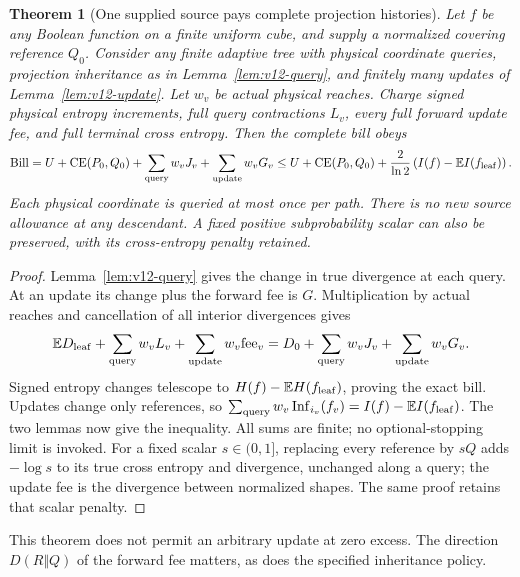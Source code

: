 \documentclass[11pt]{article}
\newtheorem{theorem}[lemma]{Theorem}
\begin{document}
\begin{theorem}[One supplied source pays complete projection histories]\label{thm:v12-bill}
Let $f$ be any Boolean function on a finite uniform cube, and supply a normalized
covering reference $Q_0$. Consider any finite adaptive tree with physical coordinate
queries, projection inheritance as in Lemma~\ref{lem:v12-query}, and finitely many
updates of Lemma~\ref{lem:v12-update}. Let $w_v$ be actual physical reaches.
Charge signed physical entropy increments, full query contractions $L_v$, every full
forward update fee, and full terminal cross entropy. Then the complete bill obeys
\[
 \mathrm{Bill}=U+\operatorname{CE}(P_0,Q_0)
               +\sum_{\rm query}w_vJ_v+\sum_{\rm update}w_vG_v
 \leq U+\operatorname{CE}(P_0,Q_0)
     +\frac2{\ln2}\left(I(f)-\mathbb E I(f_{\rm leaf})\right).
\]
Each physical coordinate is queried at most once per path. There is no new source
allowance at any descendant. A fixed positive subprobability scalar can also be
preserved, with its cross-entropy penalty retained.
\end{theorem}
\begin{proof}
Lemma~\ref{lem:v12-query} gives the change in true divergence at each query.
At an update its change plus the forward fee is $G$.
Multiplication by actual reaches and cancellation of all interior divergences gives
\[
 \mathbb E D_{\rm leaf}+\sum_{\rm query}w_vL_v
   +\sum_{\rm update}w_v\mathrm{fee}_v
 =D_0+\sum_{\rm query}w_vJ_v+\sum_{\rm update}w_vG_v.
\]
Signed entropy changes telescope to $H(f)-\mathbb EH(f_{\rm leaf})$, proving the
exact bill. Updates change only references, so
$\sum_{\rm query}w_v\operatorname{Inf}_{i_v}(f_v)
=I(f)-\mathbb EI(f_{\rm leaf})$.
The two lemmas now give the inequality. All sums are finite; no optional-stopping
limit is invoked. For a fixed scalar $s\in(0,1]$, replacing every reference by $sQ$
adds $-\log s$ to its true cross entropy and divergence, unchanged along a query;
the update fee is the divergence between normalized shapes. The same proof retains
that scalar penalty.
\end{proof}

This theorem does not permit an arbitrary update at zero excess. The direction
$D(R\Vert Q)$ of the forward fee matters, as does the specified inheritance policy.
\end{document}
